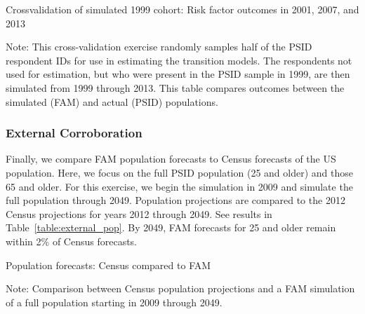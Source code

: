 \begin{table}[H]
\begin{threeparttable}
\caption{Crossvalidation of simulated 1999 cohort: Risk factor outcomes in 2001, 2007, and 2013}
\label{table:crossval_risk}
\centering
\footnotesize

\begin{tablenotes}
\footnotesize
\item Note: This cross-validation exercise randomly samples half of the PSID respondent IDs for use in estimating the transition models. The respondents not used for estimation, but who were present in the PSID sample in 1999, are then simulated from 1999 through 2013. This table compares outcomes between the simulated (FAM) and actual (PSID) populations.
\end{tablenotes}
\end{threeparttable}
\end{table}

\subsubsection{External Corroboration}
\noindent Finally, we compare FAM population forecasts to Census forecasts of the US population. Here, we focus on the full PSID population (25 and older) and those 65 and older. For this exercise, we begin the simulation in 2009 and simulate the full population through 2049. Population projections are compared to the 2012 Census projections for years 2012 through 2049. See results in Table~\ref{table:external_pop}. By 2049, FAM forecasts for 25 and older remain within 2\% of Census forecasts.

\begin{table}[H]
\begin{threeparttable}
\caption{Population forecasts: Census compared to FAM}
\label{table:external_pop}
\centering
\footnotesize

\begin{tablenotes}
\footnotesize
\item Note: Comparison between Census population projections and a FAM simulation of a full population starting in 2009 through 2049.
\end{tablenotes}
\end{threeparttable}
\end{table}

